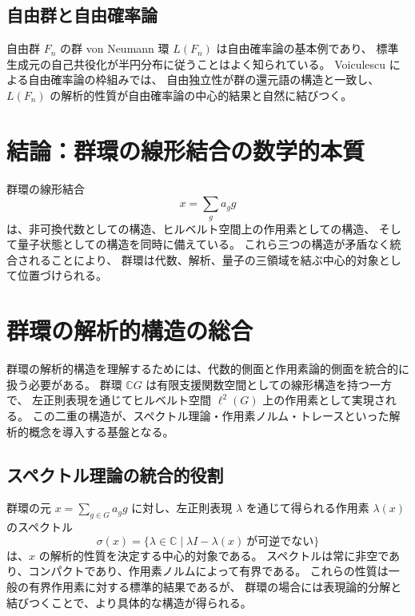 \documentclass[12pt,a4paper]{ltjarticle}
\theoremstyle{definition}
\begin{document}
\subsection{自由群と自由確率論}

自由群 $F_n$ の群 von Neumann 環 $L(F_n)$ は自由確率論の基本例であり、
標準生成元の自己共役化が半円分布に従うことはよく知られている。
Voiculescu による自由確率論の枠組みでは、
自由独立性が群の還元語の構造と一致し、
$L(F_n)$ の解析的性質が自由確率論の中心的結果と自然に結びつく。

\section{結論：群環の線形結合の数学的本質}

群環の線形結合
\[
x=\sum_g a_g g
\]
は、非可換代数としての構造、ヒルベルト空間上の作用素としての構造、
そして量子状態としての構造を同時に備えている。
これら三つの構造が矛盾なく統合されることにより、
群環は代数、解析、量子の三領域を結ぶ中心的対象として位置づけられる。

\section{群環の解析的構造の総合}

群環の解析的構造を理解するためには、代数的側面と作用素論的側面を統合的に扱う必要がある。
群環 $\mathbb{C}G$ は有限支援関数空間としての線形構造を持つ一方で、
左正則表現を通じてヒルベルト空間 $\ell^2(G)$ 上の作用素として実現される。
この二重の構造が、スペクトル理論・作用素ノルム・トレースといった解析的概念を導入する基盤となる。

\subsection{スペクトル理論の統合的役割}

群環の元 $x=\sum_{g\in G}a_g g$ に対し、左正則表現 $\lambda$ を通じて得られる作用素
$\lambda(x)$ のスペクトル
\[
\sigma(x)=\{\lambda\in\mathbb{C}\mid \lambda I-\lambda(x)\ \text{が可逆でない}\}
\]
は、$x$ の解析的性質を決定する中心的対象である。
スペクトルは常に非空であり、コンパクトであり、作用素ノルムによって有界である。
これらの性質は一般の有界作用素に対する標準的結果であるが、
群環の場合には表現論的分解と結びつくことで、より具体的な構造が得られる。
\end{document}
